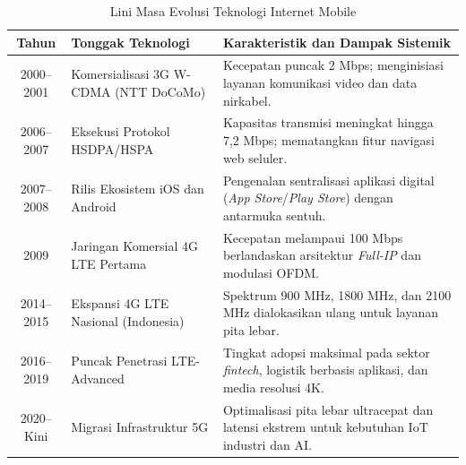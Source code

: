 \documentclass[12pt,a4paper]{article}
\begin{document}
\begin{table}[h!]
  \centering
  \small
  \caption{Lini Masa Evolusi Teknologi Internet Mobile}
  \vspace{0.3cm}
  \begin{tabular}{|c|p{4.5cm}|p{7.5cm}|}
    \hline
    \textbf{Tahun} & \textbf{Tonggak Teknologi} & \textbf{Karakteristik dan Dampak Sistemik} \tabularnewline \hline
    2000--2001 & \raggedright Komersialisasi 3G W-CDMA (NTT DoCoMo) & \raggedright Kecepatan puncak 2 Mbps; menginisiasi layanan komunikasi video dan data nirkabel. \tabularnewline \hline
    2006--2007 & \raggedright Eksekusi Protokol HSDPA/HSPA & \raggedright Kapasitas transmisi meningkat hingga 7,2 Mbps; mematangkan fitur navigasi web seluler. \tabularnewline \hline
    2007--2008 & \raggedright Rilis Ekosistem iOS dan Android & \raggedright Pengenalan sentralisasi aplikasi digital (\textit{App Store}/\textit{Play Store}) dengan antarmuka sentuh. \tabularnewline \hline
    2009 & \raggedright Jaringan Komersial 4G LTE Pertama & \raggedright Kecepatan melampaui 100 Mbps berlandaskan arsitektur \textit{Full-IP} dan modulasi OFDM. \tabularnewline \hline
    2014--2015 & \raggedright Ekspansi 4G LTE Nasional (Indonesia) & \raggedright Spektrum 900 MHz, 1800 MHz, dan 2100 MHz dialokasikan ulang untuk layanan pita lebar. \tabularnewline \hline
    2016--2019 & \raggedright Puncak Penetrasi LTE-Advanced & \raggedright Tingkat adopsi maksimal pada sektor \textit{fintech}, logistik berbasis aplikasi, dan media resolusi 4K. \tabularnewline \hline
    2020--Kini & \raggedright Migrasi Infrastruktur 5G & \raggedright Optimalisasi pita lebar ultracepat dan latensi ekstrem untuk kebutuhan IoT industri dan AI. \tabularnewline \hline
  \end{tabular}
\end{table}
\end{document}
